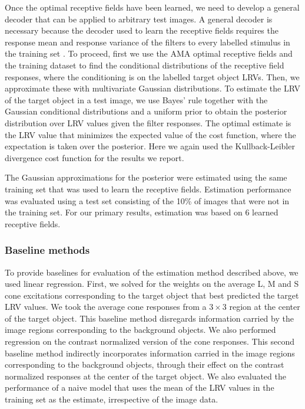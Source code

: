 \documentclass{jov}
\begin{document}
Once the optimal receptive fields have been learned, we need to develop a general decoder that can be applied to arbitrary test images.
A general decoder is necessary because the decoder used to learn the receptive fields requires the response mean and response variance of the filters to every labelled stimulus in the training set \cite{geisler2009optimal,burge2017accuracy}.
To proceed, first we use the AMA optimal receptive fields and the training dataset to find the conditional distributions of the receptive field responses, where the conditioning is on the labelled target object LRVs.
Then, we approximate these with multivariate Gaussian distributions.
To estimate the LRV of the target object in a test image, we use Bayes' rule together with the Gaussian conditional distributions and a uniform prior to obtain the posterior distribution over LRV values given the filter responses.
The optimal estimate is the LRV value that minimizes the expected value of the cost function, where the expectation is taken over the posterior.
Here we again used the Kullback-Leibler divergence cost function for the results we report.

The Gaussian approximations for the posterior were estimated using the same training set that was used to learn the receptive fields.
Estimation performance was evaluated using a test set consisting of the 10\% of images that were not in the training set.
For our primary results, estimation was based on 6 learned receptive fields.

\subsubsection*{Baseline methods}
To provide baselines for evaluation of the estimation method described above, we used linear regression.
First, we solved for the weights on the average L, M and S cone excitations corresponding to the target object that best predicted the target LRV values.
We took the average cone responses from a $3 \times 3$ region at the center of the target object.
This baseline method disregards information carried by the image regions corresponding to the background objects.
We also performed regression on the contrast normalized version of the cone responses.
This second baseline method indirectly incorporates information carried in the image regions corresponding to the background objects,
through their effect on the contrast normalized responses at the center of the target object. 
We also evaluated the performance of a naive model that uses the mean of the LRV values in the training set as the estimate, irrespective
of the image data.
\end{document}
